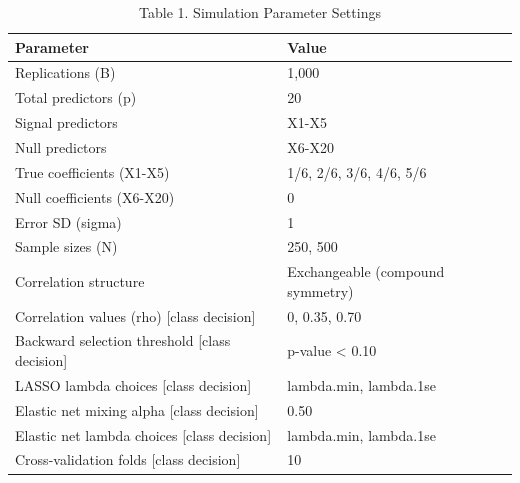 \begin{table}[ht]
\centering
\caption{Table 1. Simulation Parameter Settings} 
\begin{tabular}{ll}
  \toprule
Parameter & Value \\ 
  \midrule
Replications (B) & 1,000 \\ 
  Total predictors (p) & 20 \\ 
  Signal predictors & X1-X5 \\ 
  Null predictors & X6-X20 \\ 
  True coefficients (X1-X5) & 1/6, 2/6, 3/6, 4/6, 5/6 \\ 
  Null coefficients (X6-X20) & 0 \\ 
  Error SD (sigma) & 1 \\ 
  Sample sizes (N) & 250, 500 \\ 
  Correlation structure & Exchangeable (compound symmetry) \\ 
  Correlation values (rho) [class decision] & 0, 0.35, 0.70 \\ 
  Backward selection threshold [class decision] & p-value < 0.10 \\ 
  LASSO lambda choices [class decision] & lambda.min, lambda.1se \\ 
  Elastic net mixing alpha [class decision] & 0.50 \\ 
  Elastic net lambda choices [class decision] & lambda.min, lambda.1se \\ 
  Cross-validation folds [class decision] & 10 \\ 
   \bottomrule
\end{tabular}
\end{table}
